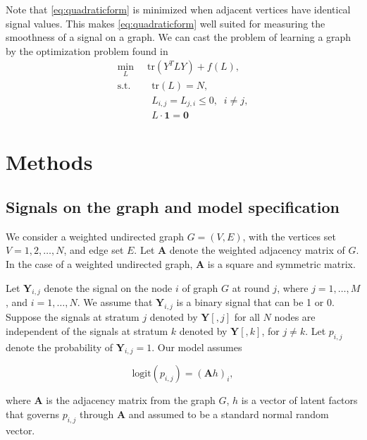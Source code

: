 \documentclass[journal]{IEEEtran}
\theoremstyle{definition}
\theoremstyle{remark}
\begin{document}
Note that \ref{eq:quadraticform} is minimized when adjacent vertices have identical signal values. This makes \ref{eq:quadraticform} well suited for measuring the smoothness of a signal on a graph. We can cast the problem of learning a graph by the optimization problem found in \cite{kalofolias2016learn}
\begin{equation}
	\begin{aligned}
		\min_L       & \phantom{..} \text{tr}(Y^TLY) + f(L), \\
		\textrm{s.t.}& \quad \text{tr}(L) = N,\\
		& \quad L_{i,j} = L_{j,i} \leq 0, \phantom{..} i \neq j, \\
		& \quad L\cdot \textbf{1} = \textbf{0}
	\end{aligned}
\end{equation}


\section{Methods}

\subsection{Signals on the graph and model specification}

We consider a weighted undirected graph $G = (V, E)$, with the vertices set $V = {1, 2, \dots, N}$, and edge set $E$.  Let $\mathbf{A}$ denote the weighted adjacency matrix of $G$. In the case of a weighted undirected graph, $\mathbf{A}$ is a square and symmetric matrix. 

Let $\mathbf{Y}_{i,j}$ denote the signal on the node $i$ of graph $G$ at round $j$, where $j = 1, \dots, M$, and $i = 1, \dots, N$. We assume that $\mathbf{Y}_{i,j}$ is a binary signal that can be 1 or 0. 
Suppose the signals at stratum $j$ denoted by $\mathbf{Y}[, j]$ for all $N$ nodes are independent of the signals at stratum $k$ denoted by $\mathbf{Y}[,k ]$, for $j \neq k$. Let $p_{i,j}$ denote the probability of $\mathbf{Y}_{i,j} = 1$. Our model assumes

\begin{equation}
\label{eq: binaryglm}
\text{logit}(p_{i,j}) = (\mathbf{A} h )_i,
\end{equation}

where $\mathbf{A}$ is the adjacency matrix from the graph $G$, $h$ is a vector of latent factors that governs $p_{i, j}$ through $\mathbf{A}$ and assumed to be a standard normal random vector. 
\end{document}
